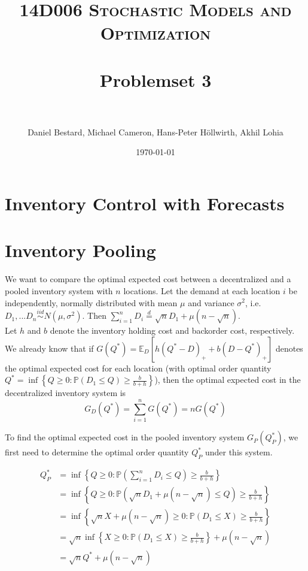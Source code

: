 \documentclass[11pt, oneside]{article}   	%
\title{
\normalfont \normalsize
\textsc{14D006 Stochastic Models and Optimization} \\ [25pt] %
\horrule{0.5pt} \\[0.4cm] %
\huge Problemset 3\\ %
\horrule{2pt} \\[0.5cm] %
}
\author{Daniel Bestard, Michael Cameron, Hans-Peter H{\"o}llwirth, Akhil Lohia} %
\date{\normalsize\today} %
\begin{document}
\maketitle


\section{Inventory Control with Forecasts}


\section{Inventory Pooling}
We want to compare the optimal expected cost between a decentralized and a pooled inventory system with $n$ locations. Let the demand at each location $i$ be independently, normally distributed with mean $\mu$ and variance $\sigma^2$, i.e. $D_1,...D_n \stackrel{iid}{\sim} N(\mu, \sigma^2)$. Then $\sum_{i=1}^n D_i \stackrel{d}{=} \sqrt{n}D_1 + \mu (n-\sqrt{n})$. \\


Let $h$ and $b$ denote the inventory holding cost and backorder cost, respectively. We already know that if $G(Q^*) = \mathbb{E}_D[h(Q^*-D)_+ + b(D-Q^*)_+]$ denotes the optimal expected cost for each location (with optimal order quantity $Q^* = \inf \left\{ Q \geq 0: \mathbb{P}\left(D_1 \leq Q \right) \geq \frac{b}{b+h} \right\}$), then the optimal expected cost in the decentralized inventory system is
$$G_D(Q^*) = \sum_{i=1}^n G(Q^*) = n G(Q^*)$$

To find the optimal expected cost in the pooled inventory system $G_P(Q_P^*)$, we first need to determine the optimal order quantity $Q_P^*$ under this system. 

\begin{align*}
Q_P^* &=  \inf \left\{ Q \geq 0: \mathbb{P}\left( \sum_{i=1}^n D_i \leq Q \right) \geq \frac{b}{b+h} \right\}\\
&=  \inf \left\{ Q \geq 0: \mathbb{P}\left( \sqrt{n}D_1 + \mu (n-\sqrt{n}) \leq Q \right) \geq \frac{b}{b+h} \right\}\\
&=  \inf \left\{ \sqrt{n}X + \mu (n-\sqrt{n}) \geq 0: \mathbb{P}\left(D_1 \leq X \right) \geq \frac{b}{b+h} \right\}\\
&=  \sqrt{n} \inf \left\{ X \geq 0: \mathbb{P}\left(D_1 \leq X \right) \geq \frac{b}{b+h} \right\} + \mu (n-\sqrt{n})\\
&=  \sqrt{n} Q^* + \mu (n-\sqrt{n})\\
\end{align*}
\end{document}
